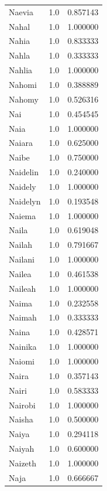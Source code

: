 \documentclass[
  letterpaper,
  DIV=11,
  numbers=noendperiod]{scrreprt}
\begin{document}
\begin{tabular}{lrr}
Naevia          &   1.0 &   0.857143 \\
Nahal           &   1.0 &   1.000000 \\
Nahia           &   1.0 &   0.833333 \\
Nahla           &   1.0 &   0.333333 \\
Nahlia          &   1.0 &   1.000000 \\
Nahomi          &   1.0 &   0.388889 \\
Nahomy          &   1.0 &   0.526316 \\
Nai             &   1.0 &   0.454545 \\
Naia            &   1.0 &   1.000000 \\
Naiara          &   1.0 &   0.625000 \\
Naibe           &   1.0 &   0.750000 \\
Naidelin        &   1.0 &   0.240000 \\
Naidely         &   1.0 &   1.000000 \\
Naidelyn        &   1.0 &   0.193548 \\
Naiema          &   1.0 &   1.000000 \\
Naila           &   1.0 &   0.619048 \\
Nailah          &   1.0 &   0.791667 \\
Nailani         &   1.0 &   1.000000 \\
Nailea          &   1.0 &   0.461538 \\
Naileah         &   1.0 &   1.000000 \\
Naima           &   1.0 &   0.232558 \\
Naimah          &   1.0 &   0.333333 \\
Naina           &   1.0 &   0.428571 \\
Nainika         &   1.0 &   1.000000 \\
Naiomi          &   1.0 &   1.000000 \\
Naira           &   1.0 &   0.357143 \\
Nairi           &   1.0 &   0.583333 \\
Nairobi         &   1.0 &   1.000000 \\
Naisha          &   1.0 &   0.500000 \\
Naiya           &   1.0 &   0.294118 \\
Naiyah          &   1.0 &   0.600000 \\
Naizeth         &   1.0 &   1.000000 \\
Naja            &   1.0 &   0.666667 \\

\end{tabular}
\end{document}
